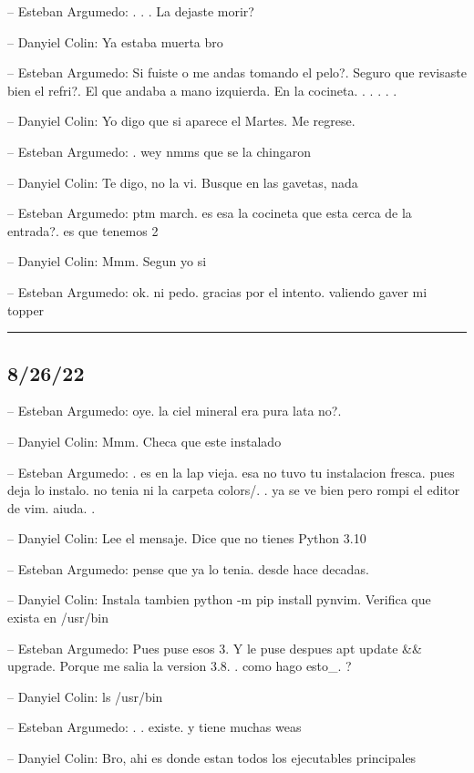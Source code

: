 -- Esteban Argumedo: . . . La dejaste morir?

-- Danyiel Colin: Ya estaba muerta bro

-- Esteban Argumedo: Si fuiste o me andas tomando el pelo?. Seguro que
revisaste bien el refri?. El que andaba a mano izquierda. En la
cocineta. . . . . .

-- Danyiel Colin: Yo digo que si aparece el Martes. Me regrese.

-- Esteban Argumedo: . wey nmms que se la chingaron

-- Danyiel Colin: Te digo, no la vi. Busque en las gavetas, nada

-- Esteban Argumedo: ptm march. es esa la cocineta que esta cerca de la
entrada?. es que tenemos 2

-- Danyiel Colin: Mmm. Segun yo si

-- Esteban Argumedo: ok. ni pedo. gracias por el intento. valiendo gaver
mi topper

\begin{center}\rule{0.5\linewidth}{0.5pt}\end{center}

\hypertarget{section-151}{%
\subsection{8/26/22}\label{section-151}}

-- Esteban Argumedo: oye. la ciel mineral era pura lata no?.

-- Danyiel Colin: Mmm. Checa que este instalado

-- Esteban Argumedo: . es en la lap vieja. esa no tuvo tu instalacion
fresca. pues deja lo instalo. no tenia ni la carpeta colors/. . ya se ve
bien pero rompi el editor de vim. aiuda. .

-- Danyiel Colin: Lee el mensaje. Dice que no tienes Python 3.10

-- Esteban Argumedo: pense que ya lo tenia. desde hace decadas.

-- Danyiel Colin: Instala tambien python -m pip install pynvim. Verifica
que exista en /usr/bin

-- Esteban Argumedo: Pues puse esos 3. Y le puse despues apt update \&\&
upgrade. Porque me salia la version 3.8. . como hago esto\_. ?

-- Danyiel Colin: ls /usr/bin

-- Esteban Argumedo: . . existe. y tiene muchas weas

-- Danyiel Colin: Bro, ahi es donde estan todos los ejecutables
principales

